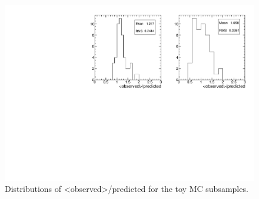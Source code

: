 \begin{figure}[tbh]
\begin{center}
\includegraphics[width=1\linewidth]{plots/abcdprime_toy.pdf}
\caption{\label{fig:abcdtoy}\protect 
Distributions of <observed>/predicted for the toy MC subsamples.
}
\end{center}
\end{figure}


